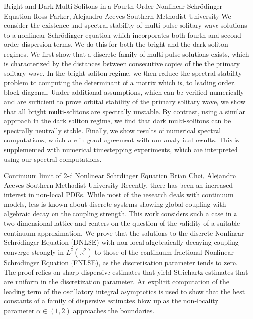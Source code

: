 \begin{addmargin}[2em]{0em}
\vspace{1.5ex}
\abs
{Bright and Dark Multi-Solitons in a Fourth-Order Nonlinear Schr\"odinger Equation}
{Ross Parker, Alejandro Aceves}
{Southern Methodist University}
{We consider the existence and spectral stability of multi-pulse solitary wave solutions to a nonlinear Schr\"odinger equation which incorporates both fourth and second-order dispersion terms. We do this for both the bright and the dark soliton regimes. We first show that a discrete family of multi-pulse solutions exists, which is characterized by the distances between consecutive copies of the the primary solitary wave. In the bright soliton regime, we then reduce the spectral stability problem to computing the determinant of a matrix which is, to leading order, block diagonal. Under additional assumptions, which can be verified numerically and are sufficient to prove orbital stability of the primary solitary wave, we show that all bright multi-solitons are spectrally unstable. By contrast, using a similar approach in the dark soliton regime, we find that dark multi-solitons can be spectrally neutrally stable. Finally, we show results of numerical spectral computations, which are in good agreement with our analytical results. This is supplemented with numerical timestepping experiments, which are interpreted using our spectral computations.}


\vspace{1.5ex}
\abs
{Continuum limit of 2-d Nonlinear Schr\"dinger Equation}
{Brian Choi, Alejandro Aceves}
{Southern Methodist University}
{Recently, there has been an increased interest in non-local PDEs. While most of the research deals with continuum models, less is known about discrete systems showing global coupling with algebraic decay on the coupling strength. This work considers such a case in a two-dimensional lattice and centers on the question of the validity of a suitable continuum approximation. We prove that the solutions to the discrete Nonlinear Schr\"odinger Equation (DNLSE) with non-local algebraically-decaying coupling converge strongly in $L^2(\mathbb{R}^2)$ to those of the continuum fractional Nonlinear Schr\"odinger Equation (FNLSE), as the discretization parameter tends to zero. The proof relies on sharp dispersive estimates that yield Strichartz estimates that are uniform in the discretization parameter. An explicit computation of the leading term of the oscillatory integral asymptotics is used to show that the best constants of a family of dispersive estimates blow up as the non-locality parameter $\alpha \in (1,2)$ approaches the boundaries.}

\end{addmargin}
